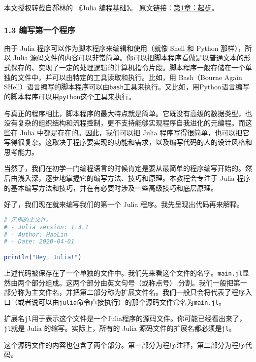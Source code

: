 
本文授权转载自郝林的 《Julia 编程基础》。 原文链接：\href{https://github.com/hyper0x/JuliaBasics/blob/master/book/ch01.md}{第1章：起步}。


\subsubsection{1.3 编写第一个程序}

由于 Julia 程序可以作为脚本程序来编辑和使用（就像 Shell 和 Python 那样），所以 Julia 源码文件的内容可以非常简单。你可以把脚本程序看做是以普通文本的形式保存的、实现了一定的处理逻辑的计算机指令片段。脚本程序一般存储在一个单独的文件中，并可以由特定的工具读取和执行。比如，用 Bash（Bourne Again SHell）语言编写的脚本程序可以由\verb|bash|工具来执行。又比如，用Python语言编写的脚本程序可以用\verb|python|这个工具来执行。

与真正的程序相比，脚本程序的最大特点就是简单。它既没有高级的数据类型，也没有复杂的组织结构和流程控制，更不支持能够实现程序自我进化的元编程。而这些在 Julia 中都是存在的。因此，我们可以把 Julia 程序写得很简单，也可以把它写得很复杂。这取决于程序要实现的功能和需求，以及编写代码的人的设计风格和思考能力。

当然了，我们在初学一门编程语言的时候肯定是要从最简单的程序编写开始的。然后由浅入深，逐步地掌握它的编写方法、技巧和原理。本教程会专注于 Julia 程序的基本编写方法和技巧，并在有必要时涉及一些高级技巧和底层原理。

好了，我们现在就来编写我们的第一个 Julia 程序。我先呈现出代码再来解释。

\begin{lstlisting}[language=julia]
# 示例的主文件。
# - Julia version: 1.3.1
# - Author: HaoLin
# - Date: 2020-04-01

println("Hey, Julia!")
\end{lstlisting}

上述代码被保存在了一个单独的文件中。我们先来看这个文件的名字。\verb|main.jl|显然由两个部分组成。这两个部分由英文句号（或称点号）.分割。我们一般把第一部分称为主文件名，并把第二部分称为扩展文件名。我们一般只会将代表了程序入口（或者说可以由\verb|julia|命令直接执行）的那个源码文件命名为\verb|main.jl|。

扩展名\verb|jl|用于表示这个文件是一个Julia程序的源码文件。你可能已经看出来了，\verb|jl|就是 Julia 的缩写。实际上，所有的 Julia 源码文件的扩展名都必须是\verb|jl|。

这个源码文件的内容也包含了两个部分。第一部分为程序注释，第二部分为程序代码。

